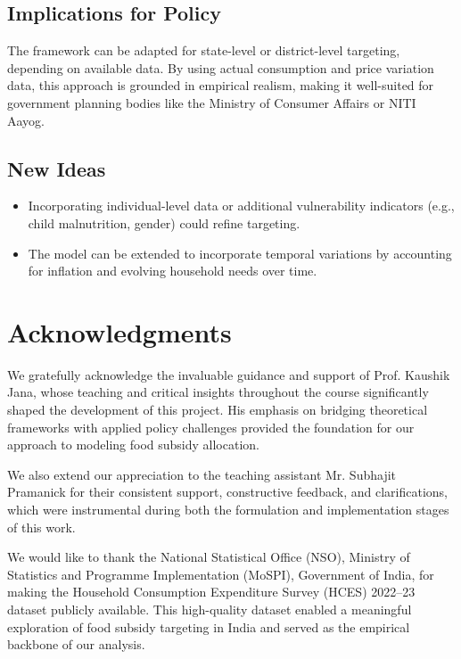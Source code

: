 \documentclass[12pt]{article}
\begin{document}
\subsection{Implications for Policy}
The framework can be adapted for state-level or district-level targeting, depending on available data. By using actual consumption and price variation data, this approach is grounded in empirical realism, making it well-suited for government planning bodies like the Ministry of Consumer Affairs or NITI Aayog.

\subsection{New Ideas}
\begin{itemize}
    \item Incorporating individual-level data or additional vulnerability indicators (e.g., child malnutrition, gender) could refine targeting.
    \item The model can be extended to incorporate temporal variations by accounting for inflation and evolving household needs over time.
\end{itemize}

\section{Acknowledgments}
We gratefully acknowledge the invaluable guidance and support of Prof. Kaushik Jana, whose teaching and critical insights throughout the course significantly shaped the development of this project. His emphasis on bridging theoretical frameworks with applied policy challenges provided the foundation for our approach to modeling food subsidy allocation.

We also extend our appreciation to the teaching assistant Mr. Subhajit Pramanick for their consistent support, constructive feedback, and clarifications, which were instrumental during both the formulation and implementation stages of this work.

We would like to thank the National Statistical Office (NSO), Ministry of Statistics and Programme Implementation (MoSPI), Government of India, for making the Household Consumption Expenditure Survey (HCES) 2022–23 dataset publicly available. This high-quality dataset enabled a meaningful exploration of food subsidy targeting in India and served as the empirical backbone of our analysis.
\end{document}
